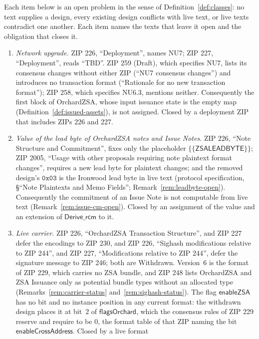 \documentclass[11pt,a4paper]{article}
\theoremstyle{definition}
\begin{document}
Each item below is an open problem in the sense of
Definition~\ref{def:classes}: no text supplies a design, every existing
design conflicts with live text, or live texts contradict one another. Each
item names the texts that leave it open and the obligation that closes it.
\begin{enumerate}[label=(\arabic*)]
\item \emph{Network upgrade.} ZIP 226, ``Deployment'', names NU7; ZIP 227,
  ``Deployment'', reads ``TBD''. ZIP 259 (Draft), which specifies NU7,
  lists its consensus changes without either ZIP (``NU7 consensus
  changes'') and introduces no transaction format (``Rationale for no new
  transaction format''); ZIP 258, which specifies NU6.3, mentions neither.
  Consequently the first block of OrchardZSA, whose input issuance state is
  the empty map (Definition~\ref{def:issued-assets}), is not assigned.
  Closed by a deployment ZIP that includes ZIPs 226 and 227.
\item \emph{Value of the lead byte of OrchardZSA notes and Issue Notes.}
  ZIP 226, ``Note Structure and Commitment'', fixes only the placeholder
  $\{\{\mathsf{ZSALEADBYTE}\}\}$; ZIP 2005, ``Usage with other proposals
  requiring note plaintext format changes'', requires a new lead byte for
  plaintext changes; and the removed design's $\mathtt{0x03}$ is the
  Ironwood lead byte in live text (protocol specification, \S``Note
  Plaintexts and Memo Fields''; Remark~\ref{rem:leadbyte-open}).
  Consequently the commitment of an Issue Note is not computable from live
  text (Remark~\ref{rem:issue-cm-open}). Closed by an assignment of the
  value and an extension of $\mathsf{Derive\_rcm}$ to it.
\item \emph{Live carrier.} ZIP 226, ``OrchardZSA Transaction Structure'',
  and ZIP 227 defer the encodings to ZIP 230, and ZIP 226, ``Sighash
  modifications relative to ZIP 244'', and ZIP 227, ``Modifications
  relative to ZIP 244'', defer the signature message to ZIP 246; both are
  Withdrawn. Version~$6$ is the format of ZIP 229, which carries no ZSA
  bundle, and ZIP 248 lists OrchardZSA and ZSA Issuance only as potential
  bundle types without an allocated type (Remarks~\ref{rem:carrier-status}
  and~\ref{rem:sighash-status}). The flag $\mathsf{enableZSA}$ has no bit
  and no instance position in any current format: the withdrawn design
  places it at bit~$2$ of $\mathsf{flagsOrchard}$, which the consensus
  rules of ZIP 229 reserve and require to be $0$, the format table of that
  ZIP naming the bit $\mathsf{enableCrossAddress}$. Closed by a live format

\end{enumerate}
\end{document}
